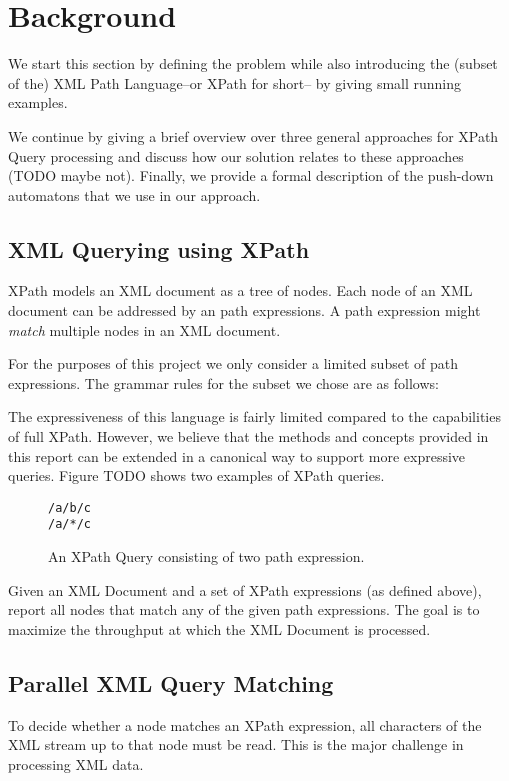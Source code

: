 \section{Background}\label{sec:background}
We start this section by defining the problem while also introducing the (subset
of the) XML Path Language–or XPath for short– by giving small
running examples.

We continue by giving a brief overview over three general approaches for XPath
Query processing and discuss how our solution relates to these approaches (TODO
maybe not). Finally, we provide a formal description of the push-down automatons
that we use in our approach.

\subsection{XML Querying using XPath}

XPath models an XML document as a tree of nodes. Each node of an XML document
can be addressed by an path expressions. A path expression might \emph{match}
multiple nodes in an XML document.

For the purposes of this project we only consider a limited subset of path
expressions. The grammar rules for the subset we chose are as follows:


The expressiveness of this language is fairly limited compared to the
capabilities of full XPath. However, we believe that the methods and concepts
provided in this report can be extended in a canonical way to support more
expressive queries. Figure TODO shows two examples of XPath queries.

\begin{figure}[htb]
\centering
\texttt{/a/b/c}\\
\texttt{/a/*/c}
\caption{An XPath Query consisting of two path expression.}
\end{figure}

 Given an XML Document and a set of XPath
expressions (as defined above), report all nodes that match any of the given
path expressions. The goal is to maximize the throughput at which the XML
Document is processed.


\subsection{Parallel XML Query Matching}
To decide whether a node matches an XPath expression, all characters of the XML
stream up to that node must be read. This is the major challenge in processing
XML data.

